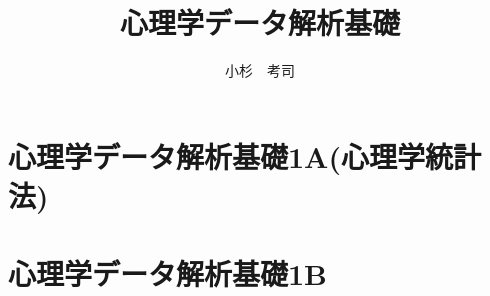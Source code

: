 \documentclass[dvipsnames]{ltjsbook}
\begin{document}
% 
\VerbatimFootnotes
\title{心理学データ解析基礎}
\author{小杉　考司}
\date{}
\maketitle
\setcounter{tocdepth}{1}



\tableofcontents

\linenumbers
\part{心理学データ解析基礎1A(心理学統計法)}















\part{心理学データ解析基礎1B}
















\appendix



\end{document}
